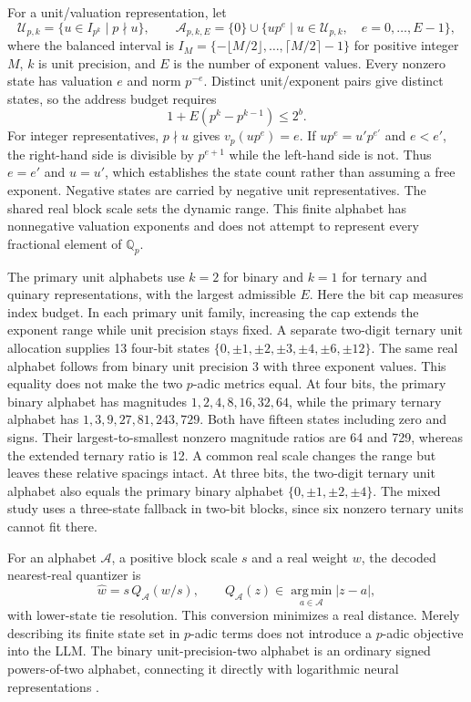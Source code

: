 \documentclass[11pt]{article}
\newcommand{\Qp}{\mathbb{Q}_p}
\begin{document}
For a unit/valuation representation, let
\begin{equation}
 \mathcal U_{p,k}
 =\{u\in I_{p^k}\mid p\nmid u\},\qquad
 \mathcal A_{p,k,E}
 =\{0\}\cup\{up^e\mid u\in\mathcal U_{p,k},\quad e=0,\ldots,E-1\},
\end{equation}
where the balanced interval is
\(I_M=\{-\lfloor M/2\rfloor,\ldots,\lceil M/2\rceil-1\}\) for positive
integer \(M\), \(k\) is unit
precision, and \(E\) is the number of exponent values. Every nonzero
state has valuation \(e\) and norm \(p^{-e}\). Distinct unit/exponent
pairs give distinct states, so the address budget requires
\begin{equation}
 1+E(p^k-p^{k-1})\leq 2^b.
\end{equation}
For integer representatives, $p\nmid u$ gives $v_p(up^e)=e$.
If $up^e=u'p^{e'}$ and $e<e'$, the right-hand side is divisible by
$p^{e+1}$ while the left-hand side is not. Thus $e=e'$ and $u=u'$,
which establishes the state count rather than assuming a free exponent.
Negative states are carried by negative unit representatives. The shared
real block scale sets the dynamic range. This finite alphabet has
nonnegative valuation exponents and does not attempt to represent every
fractional element of $\Qp$.

The primary unit alphabets use \(k=2\) for binary and \(k=1\) for ternary
and quinary representations, with the largest admissible \(E\). Here the bit cap
measures index budget. In each primary unit family, increasing the cap
extends the exponent range while unit precision stays fixed. A separate
two-digit ternary unit allocation supplies 13 four-bit states
\(\{0,\pm1,\pm2,\pm3,\pm4,\pm6,\pm12\}\). The same real alphabet follows
from binary unit precision 3 with three exponent values. This equality
does not make the two \(p\)-adic metrics equal. At four bits, the primary binary
alphabet has magnitudes \(1,2,4,8,16,32,64\), while the primary ternary
alphabet has \(1,3,9,27,81,243,729\). Both have fifteen states including
zero and signs. Their largest-to-smallest nonzero magnitude ratios are
64 and 729, whereas the extended ternary ratio is 12. A common real scale
changes the range but leaves these relative spacings intact. At three bits, the
two-digit ternary unit alphabet also equals the primary binary alphabet
\(\{0,\pm1,\pm2,\pm4\}\). The mixed study uses a three-state fallback
in two-bit blocks, since six nonzero ternary units cannot fit there.

For an alphabet \(\mathcal A\), a positive block scale \(s\) and a real
weight \(w\), the decoded nearest-real quantizer is
\begin{equation}
 \widehat w=s\,Q_{\mathcal A}(w/s),\qquad
 Q_{\mathcal A}(z)\in\operatorname*{arg\,min}_{a\in\mathcal A}|z-a|,
\end{equation}
with lower-state tie resolution. This conversion minimizes a real
distance. Merely describing its finite state set in \(p\)-adic terms
does not introduce a \(p\)-adic objective into the LLM. The binary unit-precision-two alphabet is an ordinary signed
powers-of-two alphabet, connecting it directly with logarithmic neural
representations \citep{miyashita2016log}.
\end{document}
